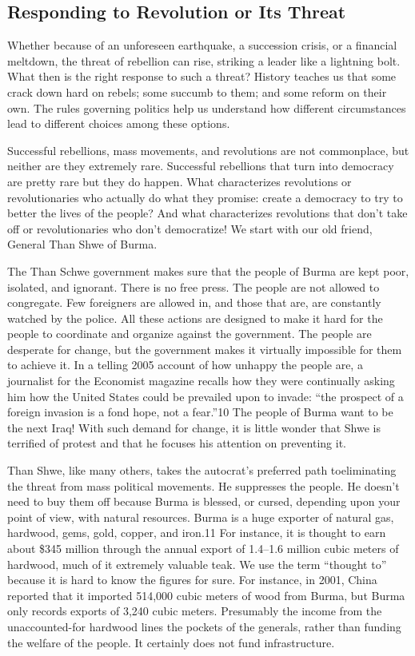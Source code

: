 \documentclass[10pt]{article}
\begin{document}
\subsection{Responding to Revolution or Its Threat}
{\large  }
{\large Whether because of an unforeseen earthquake, a succession crisis, or a
financial meltdown, the threat of rebellion can rise, striking a leader like a
lightning bolt. What then is the right response to such a threat? History teaches
us that some crack down hard on rebels; some succumb to them; and some reform on
their own. The rules governing politics help us understand how different
circumstances lead to different choices among these options.}

{\large Successful rebellions, mass movements, and revolutions are not
commonplace, but neither are they extremely rare. Successful rebellions that turn
into democracy are pretty rare but they do happen. What characterizes revolutions
or revolutionaries who actually do what they promise: create a democracy to try
to better the lives of the people? And what characterizes revolutions that don't
take off or revolutionaries who don't democratize! We start with our old friend,
General Than Shwe of Burma.}

{\large The Than Schwe government makes sure that the people of Burma are kept
poor, isolated, and ignorant. There is no free press. The people are not allowed
to congregate. Few foreigners are allowed in, and those that are, are constantly
watched by the police. All these actions are designed to make it hard for the
people to coordinate and organize against the government. The people are
desperate for change, but the government makes it virtually impossible for them
to achieve it. In a telling 2005 account of how unhappy the people are, a
journalist for the Economist magazine recalls how they were continually asking
him how the United States could be prevailed upon to invade: ``the prospect of a
foreign invasion is a fond hope, not a fear.''10 The people of Burma want to be
the next Iraq! With such demand for change, it is little wonder that Shwe is
terrified of protest and that he focuses his attention on preventing it.}

{\large Than Shwe, like many others, takes the autocrat's preferred path
toeliminating the threat from mass political movements. He suppresses the people.
He doesn't need to buy them off because Burma is blessed, or cursed, depending
upon your point of view, with natural resources. Burma is a huge exporter of
natural gas, hardwood, gems, gold, copper, and iron.11 For instance, it is
thought to earn about \$345 million through the annual export of 1.4--1.6 million
cubic meters of hardwood, much of it extremely valuable teak. We use the term
``thought to'' because it is hard to know the figures for sure. For instance, in
2001, China reported that it imported 514,000 cubic meters of wood from Burma,
but Burma only records exports of 3,240 cubic meters. Presumably the income from
the unaccounted-for hardwood lines the pockets of the generals, rather than
funding the welfare of the people. It certainly does not fund infrastructure.}
\end{document}
